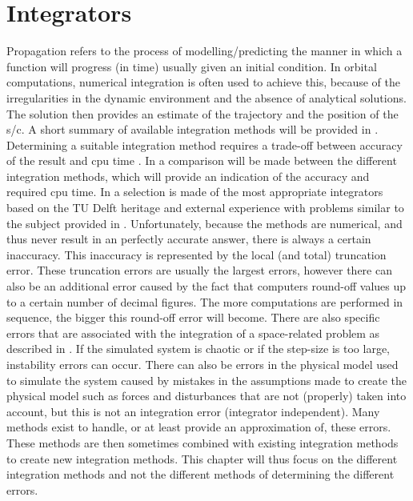 \chapter{Integrators}  %
\label{ch:int}
Propagation refers to the process of modelling/predicting the manner in which a function will progress (in time) usually given an initial condition. In orbital computations, numerical integration is often used to achieve this, because of the irregularities in the dynamic environment and the absence of analytical solutions. The solution then provides an estimate of the trajectory and the position of the \ac{s/c}\cite{hofsteenge2013}.  A short summary of available integration methods will be provided in . Determining a suitable integration method requires a trade-off between accuracy of the result and cpu time \cite{noomen2013int}. In  a comparison will be made between the different integration methods, which will provide an indication of the accuracy and required cpu time. In  a selection is made of the most appropriate integrators based on the TU Delft heritage and external experience with problems similar to the subject provided in . Unfortunately, because the methods are numerical, and thus never result in an perfectly accurate answer, there is always a certain inaccuracy. This inaccuracy is represented by the local (and total) truncation error. These truncation errors are usually the largest errors, however there can also be an additional error caused by the fact that computers round-off values up to a certain number of decimal figures. The more computations are performed in sequence, the bigger this round-off error will become. There are also specific errors that are associated with the integration of a space-related problem as described in \cite{milani1987}. If the simulated system is chaotic or if the step-size is too large, instability errors can occur. There can also be errors in the physical model used to simulate the system caused by mistakes in the assumptions made to create the physical model such as forces and disturbances that are not (properly) taken into account, but this is not an integration error (integrator independent). Many methods exist to handle, or at least provide an approximation of, these errors. These methods are then sometimes combined with existing integration methods to create new integration methods. This chapter will thus focus on the different integration methods and not the different methods of determining the different errors.


